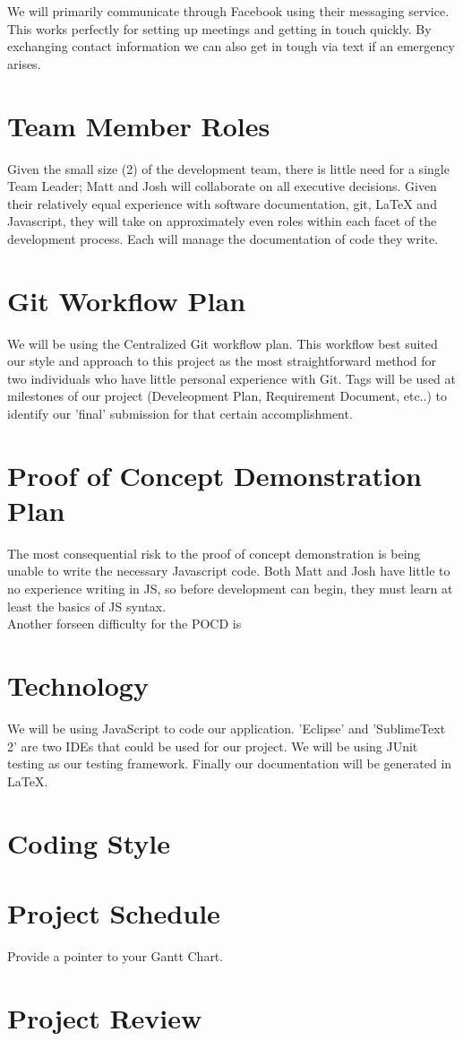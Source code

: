 \documentclass{article}
\begin{document}
	We will primarily communicate through Facebook using their messaging service. This 
	works perfectly for setting up meetings and getting in touch quickly. By exchanging 
	contact information we can also get in tough via text if an emergency arises. 
	
	\section{Team Member Roles}
	Given the small size (2) of the development team, there is little need for 
	a single Team Leader; Matt and Josh will collaborate on all executive 
	decisions. Given their relatively equal experience with software 
	documentation, git, LaTeX and Javascript, they will take on approximately 
	even roles within each facet of the development process. Each will manage 
	the documentation of code they write. 
	\section{Git Workflow Plan}
	
	We will be using the Centralized Git workflow plan. This workflow best suited our style 
	and approach to this project as the most straightforward method for two individuals 
	who have little personal experience with Git. Tags will be used at 
	milestones of our 
	project (Develeopment Plan, Requirement Document, etc..) to identify our 'final' 
	submission for that certain accomplishment. 
	
	\section{Proof of Concept Demonstration Plan}
	The most consequential risk to the proof of concept demonstration is being 
	unable to write the necessary Javascript code. Both Matt and Josh have 
	little to no experience writing in JS, so before development can begin, 
	they must learn at least the basics of JS syntax.\\
	Another forseen difficulty for the POCD is 
	\section{Technology}
	
	We will be using JavaScript to code our application. 'Eclipse' and 
	'SublimeText 2' are two 
	IDEs that could be used for our project. We will be using JUnit testing as our testing 
	framework. Finally our documentation will be generated in LaTeX.
	
	\section{Coding Style}
	
	\section{Project Schedule}
	
	Provide a pointer to your Gantt Chart.
	
	\section{Project Review}
	
\end{document}
